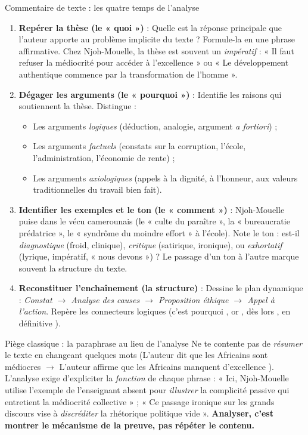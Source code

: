 \documentclass[11pt]{article}
\newcommand{\cle}[1]{{\popxbold\color{popdark}#1}}
\begin{document}
\begin{methode}{Commentaire de texte : les quatre temps de l'analyse}
\begin{enumerate}
    \item \textbf{Repérer la thèse (le « quoi »)} : Quelle est la réponse principale que l'auteur apporte au problème implicite du texte ? Formule-la en une phrase affirmative. Chez Njoh-Mouelle, la thèse est souvent un \emph{impératif} : « Il faut refuser la médiocrité pour accéder à l'excellence » ou « Le développement authentique commence par la transformation de l'homme ».
    \item \textbf{Dégager les arguments (le « pourquoi »)} : Identifie les raisons qui soutiennent la thèse. Distingue : 
    \begin{itemize}
        \item Les arguments \emph{logiques} (déduction, analogie, argument \emph{a fortiori}) ;
        \item Les arguments \emph{factuels} (constats sur la corruption, l'école, l'administration, l'économie de rente) ;
        \item Les arguments \emph{axiologiques} (appels à la dignité, à l'honneur, aux valeurs traditionnelles du travail bien fait).
    \end{itemize}
    \item \textbf{Identifier les exemples et le ton (le « comment »)} : Njoh-Mouelle puise dans le vécu camerounais (le « \cle{culte du paraître} », la « \cle{bureaucratie prédatrice} », le « \cle{syndrôme du moindre effort} » à l'école). Note le ton : est-il \emph{diagnostique} (froid, clinique), \emph{critique} (satirique, ironique), ou \emph{exhortatif} (lyrique, impératif, « nous devons ») ? Le passage d'un ton à l'autre marque souvent la structure du texte.
    \item \textbf{Reconstituer l'enchaînement (la structure)} : Dessine le plan dynamique : \emph{Constat $\rightarrow$ Analyse des causes $\rightarrow$ Proposition éthique $\rightarrow$ Appel à l'action}. Repère les connecteurs logiques (\guillemotleft c'est pourquoi \guillemotright, \guillemotleft or \guillemotright, \guillemotleft dès lors \guillemotright, \guillemotleft en définitive \guillemotright).
\end{enumerate}
\end{methode}

\begin{attention}{Piège classique : la paraphrase au lieu de l'analyse}
Ne te contente pas de \emph{résumer} le texte en changeant quelques mots (\guillemotleft L'auteur dit que les Africains sont médiocres \guillemotright $\rightarrow$ \guillemotleft L'auteur affirme que les Africains manquent d'excellence \guillemotright). L'analyse exige d'expliciter la \emph{fonction} de chaque phrase : « Ici, Njoh-Mouelle utilise l'exemple de l'enseignant absent pour \emph{illustrer} la complicité passive qui entretient la médiocrité collective » ; « Ce passage ironique sur les \guillemotleft grands discours \guillemotright vise à \emph{discréditer} la rhétorique politique vide ». \textbf{Analyser, c'est montrer le mécanisme de la preuve, pas répéter le contenu.}
\end{attention}
\end{document}
